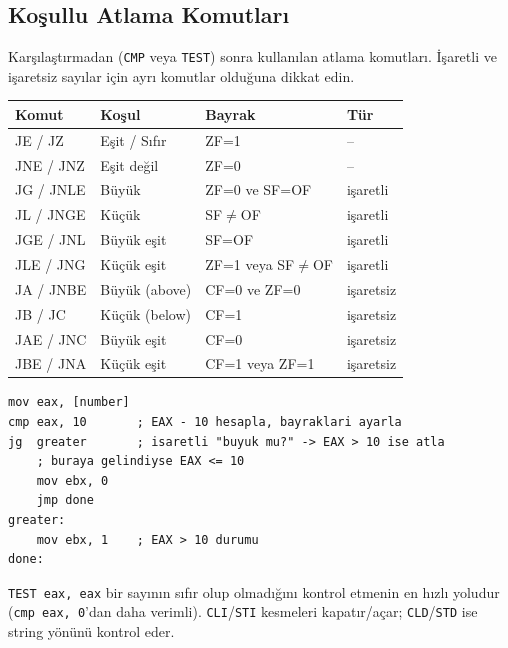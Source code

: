 \documentclass[11pt,a4paper]{article}
\newcommand{\kod}[1]{\texttt{\color{koyuGri}#1}}
\begin{document}
\subsection{Koşullu Atlama Komutları}

Karşılaştırmadan (\kod{CMP} veya \kod{TEST}) sonra kullanılan atlama komutları.
İşaretli ve işaretsiz sayılar için ayrı komutlar olduğuna dikkat edin.

\begin{center}
\small
\begin{tabularx}{\textwidth}{@{}l l l l@{}}
\toprule
\rowcolor{anaMavi}
\color{white}\textbf{Komut} & \color{white}\textbf{Koşul} & \color{white}\textbf{Bayrak} & \color{white}\textbf{Tür} \\
\midrule
JE / JZ & Eşit / Sıfır & ZF=1 & -- \\
\rowcolor{acikGri} JNE / JNZ & Eşit değil & ZF=0 & -- \\
JG / JNLE & Büyük & ZF=0 ve SF=OF & işaretli \\
\rowcolor{acikGri} JL / JNGE & Küçük & SF$\neq$OF & işaretli \\
JGE / JNL & Büyük eşit & SF=OF & işaretli \\
\rowcolor{acikGri} JLE / JNG & Küçük eşit & ZF=1 veya SF$\neq$OF & işaretli \\
JA / JNBE & Büyük (above) & CF=0 ve ZF=0 & işaretsiz \\
\rowcolor{acikGri} JB / JC & Küçük (below) & CF=1 & işaretsiz \\
JAE / JNC & Büyük eşit & CF=0 & işaretsiz \\
\rowcolor{acikGri} JBE / JNA & Küçük eşit & CF=1 veya ZF=1 & işaretsiz \\
\bottomrule
\end{tabularx}
\end{center}

\begin{ornekkutu}
\begin{lstlisting}
mov eax, [number]
cmp eax, 10       ; EAX - 10 hesapla, bayraklari ayarla
jg  greater       ; isaretli "buyuk mu?" -> EAX > 10 ise atla
    ; buraya gelindiyse EAX <= 10
    mov ebx, 0
    jmp done
greater:
    mov ebx, 1    ; EAX > 10 durumu
done:
\end{lstlisting}
\end{ornekkutu}

\begin{ipucukutu}
\kod{TEST eax, eax} bir sayının sıfır olup olmadığını kontrol etmenin en hızlı
yoludur (\kod{cmp eax, 0}'dan daha verimli). \kod{CLI}/\kod{STI} kesmeleri
kapatır/açar; \kod{CLD}/\kod{STD} ise string yönünü kontrol eder.
\end{ipucukutu}
\end{document}
